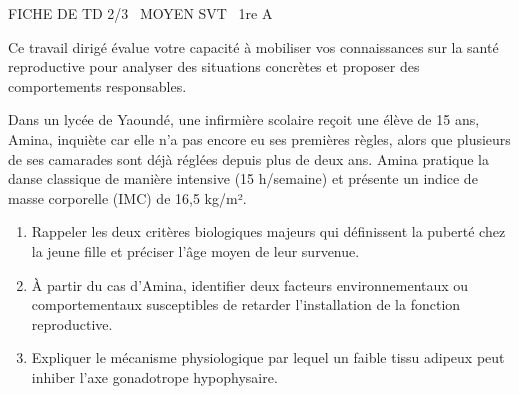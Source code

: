 \documentclass[11pt]{article}
\begin{document}
\begin{tcolorbox}[enhanced,colback=popink,colframe=popink,arc=10pt,boxrule=0pt,left=12pt,right=12pt,top=9pt,bottom=9pt]
{\color{white}\popxbold\small FICHE DE TD 2/3 \textbullet\ MOYEN \hfill SVT \textbullet\ 1re A\par}
\end{tcolorbox}
\vspace{4pt}
Ce travail dirigé évalue votre capacité à mobiliser vos connaissances sur la santé reproductive pour analyser des situations concrètes et proposer des comportements responsables.

\begin{exercice}
Dans un lycée de Yaoundé, une infirmière scolaire reçoit une élève de 15 ans, Amina, inquiète car elle n'a pas encore eu ses premières règles, alors que plusieurs de ses camarades sont déjà réglées depuis plus de deux ans. Amina pratique la danse classique de manière intensive (15 h/semaine) et présente un indice de masse corporelle (IMC) de 16,5 kg/m².
\begin{enumerate}
    \item Rappeler les deux critères biologiques majeurs qui définissent la puberté chez la jeune fille et préciser l'âge moyen de leur survenue.
    \item À partir du cas d'Amina, identifier deux facteurs environnementaux ou comportementaux susceptibles de retarder l'installation de la fonction reproductive.
    \item Expliquer le mécanisme physiologique par lequel un faible tissu adipeux peut inhiber l'axe gonadotrope hypophysaire.
\end{enumerate}
\end{exercice}
\end{document}
